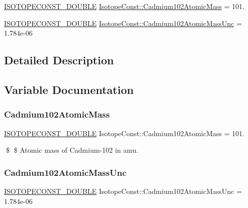 \begin{DoxyCompactItemize}
\item 
\mbox{\hyperlink{group___isotope_const-_macros_ga8f45a7272ce02c0b4c65c44636ed719a}{I\+S\+O\+T\+O\+P\+E\+C\+O\+N\+S\+T\+\_\+\+D\+O\+U\+B\+LE}} \mbox{\hyperlink{group___isotope_const-_cadmium-_cd102_gad4ecd2ce52fda14c954386cdc7fa4ba4}{Isotope\+Const\+::\+Cadmium102\+Atomic\+Mass}} = 101.
\item 
\mbox{\hyperlink{group___isotope_const-_macros_ga8f45a7272ce02c0b4c65c44636ed719a}{I\+S\+O\+T\+O\+P\+E\+C\+O\+N\+S\+T\+\_\+\+D\+O\+U\+B\+LE}} \mbox{\hyperlink{group___isotope_const-_cadmium-_cd102_gaf1b6a0ed4317f140ef04d54d6e8a975b}{Isotope\+Const\+::\+Cadmium102\+Atomic\+Mass\+Unc}} = 1.\+784e-\/06
\end{DoxyCompactItemize}


\subsection{Detailed Description}


\subsection{Variable Documentation}
\mbox{\label{group___isotope_const-_cadmium-_cd102_gad4ecd2ce52fda14c954386cdc7fa4ba4}} 
\subsubsection{\texorpdfstring{Cadmium102\+Atomic\+Mass}{Cadmium102AtomicMass}}
{\footnotesize\ttfamily \mbox{\hyperlink{group___isotope_const-_macros_ga8f45a7272ce02c0b4c65c44636ed719a}{I\+S\+O\+T\+O\+P\+E\+C\+O\+N\+S\+T\+\_\+\+D\+O\+U\+B\+LE}} Isotope\+Const\+::\+Cadmium102\+Atomic\+Mass = 101.}

\$ \$ Atomic mass of Cadmium-\/102 in amu. \mbox{\label{group___isotope_const-_cadmium-_cd102_gaf1b6a0ed4317f140ef04d54d6e8a975b}} 
\subsubsection{\texorpdfstring{Cadmium102\+Atomic\+Mass\+Unc}{Cadmium102AtomicMassUnc}}
{\footnotesize\ttfamily \mbox{\hyperlink{group___isotope_const-_macros_ga8f45a7272ce02c0b4c65c44636ed719a}{I\+S\+O\+T\+O\+P\+E\+C\+O\+N\+S\+T\+\_\+\+D\+O\+U\+B\+LE}} Isotope\+Const\+::\+Cadmium102\+Atomic\+Mass\+Unc = 1.\+784e-\/06}

